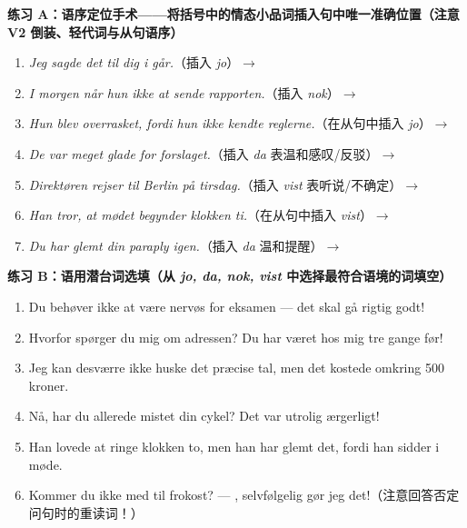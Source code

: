 
\textbf{练习 A：语序定位手术——将括号中的情态小品词插入句中唯一准确位置（注意 V2 倒装、轻代词与从句语序）}
\begin{enumerate}
  \item \textit{Jeg sagde det til dig i går.}（插入 \textit{jo}）$\rightarrow$
  \item \textit{I morgen når hun ikke at sende rapporten.}（插入 \textit{nok}）$\rightarrow$
  \item \textit{Hun blev overrasket, fordi hun ikke kendte reglerne.}（在从句中插入 \textit{jo}）$\rightarrow$
  \item \textit{De var meget glade for forslaget.}（插入 \textit{da} 表温和感叹/反驳）$\rightarrow$
  \item \textit{Direktøren rejser til Berlin på tirsdag.}（插入 \textit{vist} 表听说/不确定）$\rightarrow$
  \item \textit{Han tror, at mødet begynder klokken ti.}（在从句中插入 \textit{vist}）$\rightarrow$
  \item \textit{Du har glemt din paraply igen.}（插入 \textit{da} 温和提醒）$\rightarrow$
\end{enumerate}

\textbf{练习 B：语用潜台词选填（从 \textit{jo, da, nok, vist} 中选择最符合语境的词填空）}
\begin{enumerate}
  \item Du behøver ikke at være nervøs for eksamen --- det skal \underline{\hspace{2.2cm}} gå rigtig godt!
  \item Hvorfor spørger du mig om adressen? Du har \underline{\hspace{2.2cm}} været hos mig tre gange før!
  \item Jeg kan desværre ikke huske det præcise tal, men det kostede \underline{\hspace{2.2cm}} omkring 500 kroner.
  \item Nå, har du allerede mistet din cykel? Det var \underline{\hspace{2.2cm}} utrolig ærgerligt!
  \item Han lovede at ringe klokken to, men han har \underline{\hspace{2.2cm}} glemt det, fordi han sidder i møde.
  \item Kommer du ikke med til frokost? --- \underline{\hspace{2.2cm}}, selvfølgelig gør jeg det!（注意回答否定问句时的重读词！）
\end{enumerate}


